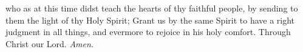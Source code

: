 {} who as at this time didst teach the hearts of thy faithful people, by sending to them the light of thy Holy Spirit; Grant us by the same Spirit to have a right judgment in all things, and evermore to rejoice in his holy comfort. Through Christ our Lord. \textit{Amen.}%



























